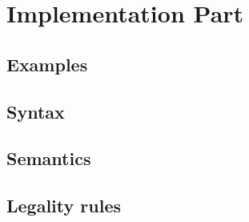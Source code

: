 \chapter{Implementation Part} %

\section{Examples}%

\section{Syntax} %

\section{Semantics} %

\section{Legality rules}

\faq{}
\comments{
}
